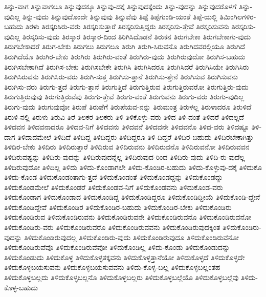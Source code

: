 {ತಿನ್ನು-ವಾಗ
ತಿನ್ನುವಾಗಲೂ
ತಿನ್ನುವುದಕ್ಕೂ
ತಿನ್ನುವು-ದಕ್ಕೆ
ತಿನ್ನುವುದಕ್ಕೆಂದು
ತಿನ್ನು-ವುದನ್ನು
ತಿನ್ನುವುದರೊಳಗೆ
ತಿನ್ನು-ವುದಿಲ್ಲ
ತಿನ್ನು-ವುದು
ತಿನ್ನುವುದೊಂದೇ
ತಿನ್ನುವುವು
ತಿನ್ನುವೆವು
ತಿಪ್ಪೆ
ತಿಪ್ಪೆಗುಂಡಿ-ಯಂತೆ
ತಿಪ್ಪೆ-ಯಲ್ಲಿ
ತಿಮಿಂಗಿಲಗಳಿರ-ಬಹುದು
ತಿರಳು
ತಿರಸ್ಕರಿಸಿರು-ವರು
ತಿರಸ್ಕರಿಸುತ್ತಾರೆ
ತಿರಸ್ಕರಿಸುತ್ತಿದ್ದರು
ತಿರಸ್ಕರಿಸು-ತ್ತೇವೆ
ತಿರಸ್ಕರಿಸುವನು
ತಿರಸ್ಕರಿಸು-ವುದಿಲ್ಲ
ತಿರಸ್ಕರಿಸು-ವುದು
ತಿರಸ್ಕಾರ
ತಿರಸ್ಕಾರ-ದಿಂದ
ತಿರಿಗಿಸಿದೊಡನೆ
ತಿರುಕನ
ತಿರುಗಬೇಕಾ
ತಿರುಗಬೇಕಾಗು-ವುದು
ತಿರುಗಬೇಕಾದರೆ
ತಿರುಗ-ಬೇಕು
ತಿರುಗಲು
ತಿರುಗಲೂ
ತಿರುಗಿ
ತಿರುಗಿ-ಸಿರುವನೊ
ತಿರುಗಿದವರಲ್ಲಿಯೂ
ತಿರುಗಿದೆ
ತಿರುಗಿದೆಯೊ
ತಿರುಗಿರ-ಬೇಕು
ತಿರುಗಿರು
ತಿರುಗಿರು-ವಂತೆ
ತಿರುಗಿರು-ವುದು
ತಿರುಗಿರುವುದೋ
ತಿರುಗಿಸ-ಬಹುದು
ತಿರುಗಿಸಬೇಕಾಗಿದೆ
ತಿರುಗಿಸ-ಬೇಕು
ತಿರುಗಿಸಬೇಕೇ
ತಿರುಗಿಸಿ
ತಿರುಗಿಸಿದರೂ
ತಿರುಗಿಸಿದರೆ
ತಿರುಗಿಸಿಯೇ
ತಿರುಗಿಸಿರು
ತಿರುಗಿಸಿರುವನು
ತಿರುಗಿಸಿರು-ವರು
ತಿರುಗಿ-ಸುತ್ತ
ತಿರುಗಿಸು-ತ್ತಾನೆ
ತಿರುಗಿಸು-ತ್ತೇನೆ
ತಿರುಗಿಸುವ
ತಿರುಗಿಸುವನು
ತಿರುಗಿಸು-ವರು
ತಿರುಗು-ತ್ತದೆ
ತಿರುಗು-ತ್ತಾನೆ
ತಿರುಗುತ್ತಿದೆ
ತಿರುಗುತ್ತಿರುವ
ತಿರುಗುತ್ತಿರುವರೋ
ತಿರುಗುತ್ತಿರು-ವುದು
ತಿರುಗುತ್ತಿರುವುವು
ತಿರುಗುತ್ತಿರುವೆವು
ತಿರುಗು-ತ್ತೇವೆ
ತಿರುಗು-ವಂತೆ
ತಿರುಗುವನು
ತಿರುಗು-ವರು
ತಿರುಗು-ವುದಿಲ್ಲ
ತಿರುಗು-ವುದು
ತಿರುಗುವುವೋ
ತಿರುಪೆ
ತಿರುಪೆಗೆ
ತಿರುಪೆಯವ-ನನ್ನು
ತಿರುಮಂತ್ರ
ತಿರುಳಲ್ಲ
ತಿರುಳಾದರೂ
ತಿರುಳಿದೆ
ತಿರುಳಿ-ನಲ್ಲಿ
ತಿರುಳು
ತಿರುವಿ
ತಿರೆ
ತಿಲಕರ
ತಿಲಕರು
ತಿಳಿ
ತಿಳಿಕೊಳ್ಳು-ವರು
ತಿಳಿದ
ತಿಳಿ-ದಂತೆ
ತಿಳಿದರೆ
ತಿಳಿದಲ್ಲದೆ
ತಿಳಿದವನ
ತಿಳಿದವನಾದರೂ
ತಿಳಿದವ-ನಿಗೆ
ತಿಳಿದವನು
ತಿಳಿದವನೆ
ತಿಳಿದವನೇ
ತಿಳಿದವನೊ
ತಿಳಿದ-ವರು
ತಿಳಿದಷ್ಟೂ
ತಿಳಿ-ದಾಗ
ತಿಳಿದಾದಮೇಲೆ
ತಿಳಿದಿದೆ
ತಿಳಿದಿದ್ದ
ತಿಳಿದಿದ್ದರು
ತಿಳಿದಿದ್ದರೂ
ತಿಳಿ-ದಿದ್ದರೆ
ತಿಳಿದಿರ-ಬಹುದು
ತಿಳಿದಿರಬೇಕಾಗಿತ್ತು
ತಿಳಿದಿರ-ಬೇಕು
ತಿಳಿದಿರು
ತಿಳಿದಿರುತ್ತಾರೆ
ತಿಳಿದಿರುವ
ತಿಳಿದಿರುವನು
ತಿಳಿದಿರುವನೊ
ತಿಳಿದಿರುವನೋ
ತಿಳಿದಿರುವವನ
ತಿಳಿದಿರುವಷ್ಟನ್ನು
ತಿಳಿದಿರು-ವುದನ್ನು
ತಿಳಿದಿರುವುದನ್ನೆಲ್ಲ
ತಿಳಿದಿರುವುದ-ರಿಂದ
ತಿಳಿದಿರು-ವುದು
ತಿಳಿದಿ-ರು-ವುದೆಲ್ಲ
ತಿಳಿದಿರುವುದೋ
ತಿಳಿದಿಲ್ಲ
ತಿಳಿದು
ತಿಳಿದು-ಕೊಂಡಾಗಲೇ
ತಿಳಿದು-ಕೊಂಡಿರ-ಬಹುದು
ತಿಳಿದು-ಕೊಳ್ಳುವು-ದಕ್ಕೆ
ತಿಳಿದುಕೊ
ತಿಳಿದು-ಕೊಂಡ
ತಿಳಿದುಕೊಂಡಂತಾಗು-ತ್ತದೆ
ತಿಳಿದುಕೊಂಡಂತೆ
ತಿಳಿದುಕೊಂಡದ್ದನ್ನು
ತಿಳಿದುಕೊಂಡದ್ದು
ತಿಳಿದುಕೊಂಡಮೇಲೆ
ತಿಳಿದುಕೊಂಡರೆ
ತಿಳಿದುಕೊಂಡವ-ನಿಗೆ
ತಿಳಿದುಕೊಂಡವನು
ತಿಳಿದುಕೊಂಡ-ವರು
ತಿಳಿದುಕೊಂಡಾಗ
ತಿಳಿದುಕೊಂಡಾದ
ತಿಳಿದುಕೊಂಡಿದ್ದ
ತಿಳಿದುಕೊಂಡಿದ್ದರೂ
ತಿಳಿದುಕೊಂಡಿದ್ದೀಯೆ
ತಿಳಿದುಕೊಂಡಿ-ದ್ದೇನೆ
ತಿಳಿದುಕೊಂಡಿದ್ದೇವೆ
ತಿಳಿದುಕೊಂಡಿರ
ತಿಳಿದುಕೊಂಡಿರ-ಬಹುದು
ತಿಳಿದುಕೊಂಡಿರ-ಬೇಕು
ತಿಳಿದುಕೊಂಡಿರು
ತಿಳಿದುಕೊಂಡಿರುವ
ತಿಳಿದುಕೊಂಡಿರುವನು
ತಿಳಿದುಕೊಂಡಿರುವನೇ
ತಿಳಿದುಕೊಂಡಿರುವನೊ
ತಿಳಿದುಕೊಂಡಿರುವನೋ
ತಿಳಿದುಕೊಂಡಿರು-ವರು
ತಿಳಿದುಕೊಂಡಿರುವರೊ
ತಿಳಿದುಕೊಂಡಿರುವವನು
ತಿಳಿದುಕೊಂಡಿರುವುದಕ್ಕಿಂತ
ತಿಳಿದುಕೊಂಡಿರು-ವುದನ್ನು
ತಿಳಿದುಕೊಂಡಿರುವುದಲ್ಲ
ತಿಳಿದುಕೊಂಡಿರು-ವುದು
ತಿಳಿದುಕೊಂಡಿರುವುದೂ
ತಿಳಿದುಕೊಂಡಿರುವೆನೋ
ತಿಳಿದುಕೊಂಡಿರುವೆವೊ
ತಿಳಿದುಕೊಂಡಿರುವೆವೋ
ತಿಳಿದುಕೊಂಡಿಲ್ಲ
ತಿಳಿದು-ಕೊಂಡು
ತಿಳಿದುಕೊಂಡುದನ್ನು
ತಿಳಿದುಕೊಂಡುದು
ತಿಳಿದುಕೊಳ್ಳ
ತಿಳಿದುಕೊಳ್ಳತಕ್ಕವನು
ತಿಳಿದುಕೊಳ್ಳತ್ತಾನೆಯೋ
ತಿಳಿದುಕೊಳ್ಳದೆ
ತಿಳಿದುಕೊಳ್ಳದೇ
ತಿಳಿದುಕೊಳ್ಳಬಯಸುವನು
ತಿಳಿದುಕೊಳ್ಳಬಯಸುವವನು
ತಿಳಿದು-ಕೊಳ್ಳ-ಬಲ್ಲ
ತಿಳಿದುಕೊಳ್ಳಬಲ್ಲಂತಹ
ತಿಳಿದುಕೊಳ್ಳಬಲ್ಲದು
ತಿಳಿದುಕೊಳ್ಳಬಲ್ಲನೊ
ತಿಳಿದುಕೊಳ್ಳಬಲ್ಲರು
ತಿಳಿದುಕೊಳ್ಳಬಲ್ಲೆಯೊ
ತಿಳಿದುಕೊಳ್ಳಬಲ್ಲೆವು
ತಿಳಿದು-ಕೊಳ್ಳ-ಬಹುದು
}
